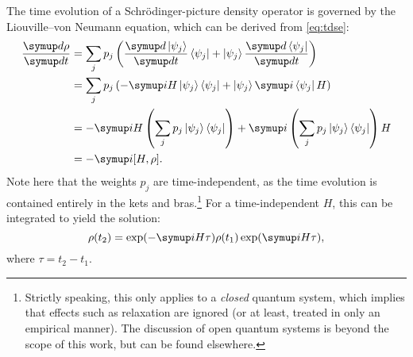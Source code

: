 The time evolution of a Schr\"odinger-picture density operator is governed by the Liouville--von Neumann equation, which can be derived from \cref{eq:tdse}:
\begin{align}
    \label{eq:lvn}
    \frac{\md\rho}{\md t} &= \sum_j p_j \left(\frac{\md\ket{\psi_j}}{\md t}\bra{\psi_j} + \ket{\psi_j}\frac{\md\bra{\psi_j}}{\md t} \right) \notag \\
                                       &= \sum_j p_j \left(-\mi H\ket{\psi_j}\bra{\psi_j} + \ket{\psi_j}\mi\bra{\psi_j}H \right) \notag \\
                                       &= -\mi H \left(\sum_j p_j\ket{\psi_j}\bra{\psi_j}\right) + \mi \left(\sum_j p_j \ket{\psi_j}\bra{\psi_j}\right) H \notag \\
                                       &= -\mi [H, \rho].
\end{align}
Note here that the weights $p_j$ are time-independent, as the time evolution is contained entirely in the kets and bras.\footnote{Strictly speaking, this only applies to a \textit{closed} quantum system, which implies that effects such as relaxation are ignored (or at least, treated in only an empirical manner). The discussion of open quantum systems is beyond the scope of this work, but can be found elsewhere.\autocite{Breuer2002,Lidar2019arXiv}}
For a time-independent $H$, this can be integrated to yield the solution:
\begin{equation}
    \label{eq:lvn_integrated}
    \rho(t_2) = \exp(-\mi H\tau)\rho(t_1)\exp(\mi H\tau),
\end{equation}
where $\tau = t_2 - t_1$.

